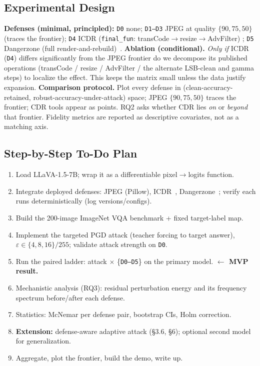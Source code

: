 \documentclass[11pt]{article}
\begin{document}
\subsection{Experimental Design}
\textbf{Defenses (minimal, principled):}
\texttt{D0} none; \texttt{D1--D3} JPEG at quality $\{90,75,50\}$ (traces the
frontier); \texttt{D4} ICDR (\texttt{final\_fun}: transCode$\to$resize$\to$AdvFilter)
\cite{icdr}; \texttt{D5} Dangerzone (full render-and-rebuild)~\cite{dangerzone}.
\textbf{Ablation (conditional).} \emph{Only if} ICDR (\texttt{D4}) differs
significantly from the JPEG frontier do we decompose its published operations
(transCode / resize / AdvFilter / the alternate LSB-clean and gamma steps) to
localize the effect. This keeps the matrix small unless the data justify
expansion.
\textbf{Comparison protocol.} Plot every defense in
(clean-accuracy-retained, robust-accuracy-under-attack) space; JPEG
$\{90,75,50\}$ traces the frontier; CDR tools appear as points. RQ2 asks whether
CDR lies \emph{on} or \emph{beyond} that frontier. Fidelity metrics are reported
as descriptive covariates, not as a matching axis.

\subsection{Step-by-Step To-Do Plan}
\begin{enumerate}
\item Load LLaVA-1.5-7B; wrap it as a differentiable pixel$\to$logits function.
\item Integrate deployed defenses: JPEG (Pillow), ICDR~\cite{icdr},
      Dangerzone~\cite{dangerzone}; verify each runs deterministically (log
      versions/configs).
\item Build the 200-image ImageNet VQA benchmark + fixed target-label map.
\item Implement the targeted PGD attack (teacher forcing to target answer),
      $\varepsilon\in\{4,8,16\}/255$; validate attack strength on \texttt{D0}.
\item Run the paired ladder: attack $\times$ \{\texttt{D0--D5}\} on the primary
      model. \textbf{$\leftarrow$ MVP result.}
\item Mechanistic analysis (RQ3): residual perturbation energy and its frequency
      spectrum before/after each defense.
\item Statistics: McNemar per defense pair, bootstrap CIs, Holm correction.
\item \textbf{Extension:} defense-aware adaptive attack (\S3.6, \S6); optional
      second model for generalization.
\item Aggregate, plot the frontier, build the demo, write up.
\end{enumerate}
\end{document}
